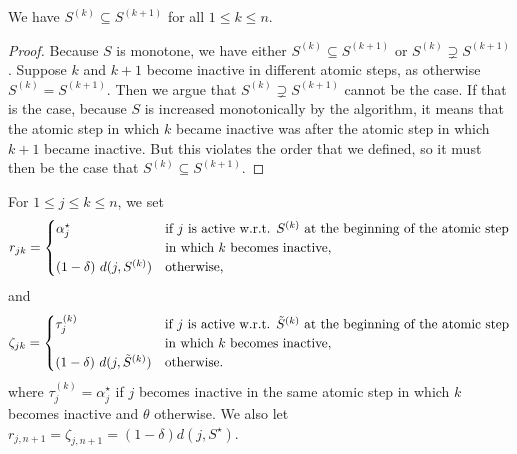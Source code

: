 \begin{observation}
\label{obs:s-mono-robust}
We have $S^{(k)} \subseteq S^{(k+1)}$ for all $1 \leq k \leq n$.
\end{observation}
\begin{proof}
    Because $S$ is monotone, we have either $S^{(k)} \subseteq S^{(k+1)}$ or $S^{(k)} \supsetneq S^{(k+1)}$.
    Suppose $k$ and $k+1$ become inactive in different atomic steps, as otherwise $S^{(k)} = S^{(k+1)}$.
    Then we argue that $S^{(k)} \supsetneq S^{(k+1)}$ cannot be the case.
    If that is the case, because $S$ is increased monotonically by the algorithm, it means that the atomic step in which $k$ became inactive was after the atomic step in which $k+1$ became inactive.
    But this violates the order that we defined, so it must then be the case that $S^{(k)} \subseteq S^{(k+1)}$.
\end{proof}

For $1 \le j \leq k \le n$, we set 
\[
    r_{jk} =
    \begin{cases}
        \alpha^\star_j &
        \begin{array}[t]{@{}l@{}}
            \text{if $j$ is active w.r.t. $S^{(k)}$ at the beginning of the atomic step}\\
            \text{in which $k$ becomes inactive},
        \end{array}
        \\[2mm]
       (1-\delta)~d(j, S^{(k)}) & \text{otherwise},
    \end{cases}
\]
and
\[
    \zeta_{jk} = 
    \begin{cases}
        \tau_j^{(k)} &
        \begin{array}[t]{@{}l@{}}
            \text{if $j$ is active w.r.t. $\tilde{S}^{(k)}$ at the beginning of the atomic step}\\
            \text{in which $k$ becomes inactive},
        \end{array}
        \\[2mm]
       (1-\delta)~d(j, \tilde{S}^{(k)}) & \text{otherwise}.
    \end{cases}
\]
where $\tau_j^{(k)} = \alpha_j^\star$ if $j$ becomes inactive in the same atomic step in which $k$ becomes inactive and $\theta$ otherwise.
We also let $r_{j,n+1} = \zeta_{j,n+1} = (1-\delta)d(j, S^\star)$. 


